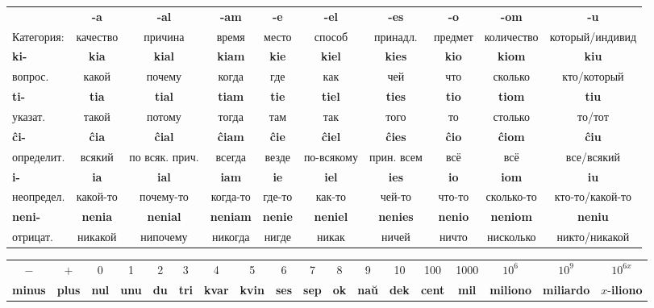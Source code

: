 \documentclass{article}
\def\b#1{\textbf{#1}}
\begin{document}
\begin{tabular}{lccccccccc}
 & \b{-a} & \b{-al} & \b{-am} & \b{-e} & \b{-el} & \b{-es} & \b{-o} & \b{-om} & \b{-u} \\
Категория: & качество & причина & время & место & способ & принадл. & предмет & количество & который/индивид \\
\b{ki-} & \b{kia} & \b{kial} & \b{kiam} & \b{kie} & \b{kiel} & \b{kies} & \b{kio} & \b{kiom} & \b{kiu} \\
вопрос. & какой & почему & когда & где & как & чей & что & сколько & кто/который \\
\b{ti-} & \b{tia} & \b{tial} & \b{tiam} & \b{tie} & \b{tiel} & \b{ties} & \b{tio} & \b{tiom} & \b{tiu} \\
указат. & такой & потому & тогда & там & так & того & то & столько & то/тот \\
\b{ĉi-} & \b{ĉia} & \b{ĉial} & \b{ĉiam} & \b{ĉie} & \b{ĉiel} & \b{ĉies} & \b{ĉio} & \b{ĉiom} & \b{ĉiu} \\
определит. & всякий & по всяк. прич. & всегда & везде & по-всякому & прин. всем & всё & всё & все/всякий \\
\b{i-} & \b{ia} & \b{ial} & \b{iam} & \b{ie} & \b{iel} & \b{ies} & \b{io} & \b{iom} & \b{iu} \\
неопредел. & какой-то & почему-то & когда-то & где-то & как-то & чей-то & что-то & сколько-то & кто-то/какой-то \\
\b{neni-} & \b{nenia} & \b{nenial} & \b{neniam} & \b{nenie} & \b{neniel} & \b{nenies} & \b{nenio} & \b{neniom} & \b{neniu} \\
отрицат. & никакой & нипочему & никогда & нигде & никак & ничей & ничто & нисколько & никто/никакой \\
\end{tabular}

\begin{tabular}{cccccccccccccccccc}
$-$ & $+$ & 0 & 1 & 2 & 3 & 4 & 5 & 6 & 7 & 8 & 9 & 10 & 100 & 1000 & $10^6$ & $10^9$ & $10^{6x}$ \\
\b{minus} & \b{plus} & \b{nul} & \b{unu} & \b{du} & \b{tri} & \b{kvar} & \b{kvin} & \b{ses} & \b{sep} & \b{ok} & \b{naŭ} & \b{dek} & \b{cent} & \b{mil} & \b{miliono} & \b{miliardo} & $x$-\b{iliono} \\
\end{tabular}
\end{document}
